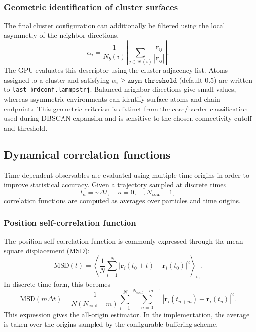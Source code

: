 \documentclass[final,1p,times]{elsarticle}
\begin{document}
\subsubsection{Geometric identification of cluster surfaces}
The final cluster configuration can additionally be filtered using the
local asymmetry of the neighbor directions,
\begin{equation}
\alpha_i=\frac{1}{N_b(i)}\left|\sum_{j\in\mathcal N(i)}
\frac{\mathbf r_{ij}}{|\mathbf r_{ij}|}\right|.
\end{equation}
The GPU evaluates this descriptor using the cluster adjacency list.
Atoms assigned to a cluster and satisfying
$\alpha_i\ge\texttt{asym\_threshold}$ (default 0.5) are written to
\texttt{last\_brdconf.lammpstrj}. Balanced neighbor directions give
small values, whereas asymmetric environments can identify surface
atoms and chain endpoints. This geometric criterion is distinct from
the core/border classification used during DBSCAN expansion and is
sensitive to the chosen connectivity cutoff and threshold.

\subsection{Dynamical correlation functions}

Time-dependent observables are evaluated using multiple time origins in order to improve statistical accuracy. Given a trajectory sampled at discrete times
\[
t_n = n \Delta t, \quad n=0,\ldots,N_{\mathrm{conf}}-1,
\]
correlation functions are computed as averages over particles and time origins.

\subsubsection{Position self-correlation function}
The position self-correlation function is commonly expressed through the mean-square displacement (MSD):
\[
\mathrm{MSD}(t) = \left\langle \frac{1}{N} \sum_{i=1}^{N} \left| \mathbf{r}_i(t_0+t)-\mathbf{r}_i(t_0) \right|^2 \right\rangle_{t_0}.
\]
In discrete-time form, this becomes
\[
\mathrm{MSD}(m\Delta t)= \frac{1}{N(N_{\mathrm{conf}}-m)} \sum_{i=1}^{N} \sum_{n=0}^{N_{\mathrm{conf}}-m-1} \left| \mathbf{r}_i(t_{n+m})-\mathbf{r}_i(t_n) \right|^2.
\]
This expression gives the all-origin estimator. In the implementation, the average is taken over the origins sampled by the configurable buffering scheme.
\end{document}
